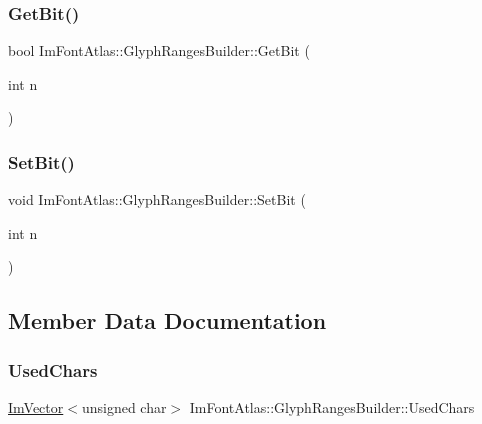\hypertarget{struct_im_font_atlas_1_1_glyph_ranges_builder_a157a4d95c361d717c073d5815d576eb5}{}\label{struct_im_font_atlas_1_1_glyph_ranges_builder_a157a4d95c361d717c073d5815d576eb5} 
\subsubsection{\texorpdfstring{Get\+Bit()}{GetBit()}}
{\footnotesize\ttfamily bool Im\+Font\+Atlas\+::\+Glyph\+Ranges\+Builder\+::\+Get\+Bit (\begin{DoxyParamCaption}\item[{int}]{n }\end{DoxyParamCaption})}

\hypertarget{struct_im_font_atlas_1_1_glyph_ranges_builder_aff570c016f17c1cd8d3a819b5f7a056c}{}\label{struct_im_font_atlas_1_1_glyph_ranges_builder_aff570c016f17c1cd8d3a819b5f7a056c} 
\subsubsection{\texorpdfstring{Set\+Bit()}{SetBit()}}
{\footnotesize\ttfamily void Im\+Font\+Atlas\+::\+Glyph\+Ranges\+Builder\+::\+Set\+Bit (\begin{DoxyParamCaption}\item[{int}]{n }\end{DoxyParamCaption})}



\subsection{Member Data Documentation}
\hypertarget{struct_im_font_atlas_1_1_glyph_ranges_builder_a369924c3fbeeac0402a6c02d62dd4a71}{}\label{struct_im_font_atlas_1_1_glyph_ranges_builder_a369924c3fbeeac0402a6c02d62dd4a71} 
\subsubsection{\texorpdfstring{Used\+Chars}{UsedChars}}
{\footnotesize\ttfamily \hyperlink{class_im_vector}{Im\+Vector}$<$unsigned char$>$ Im\+Font\+Atlas\+::\+Glyph\+Ranges\+Builder\+::\+Used\+Chars}

